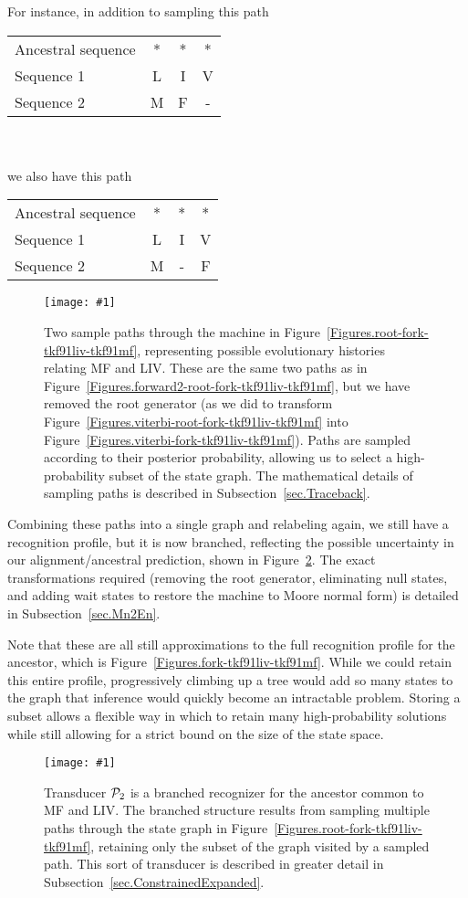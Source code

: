 \documentclass{article}
\newcommand{\secref}[1]{Subsection~\ref{sec.#1}}
\newcommand{\figref}[1]{Figure~\ref{Figures.#1}}
\newcommand{\figlabel}[1]{\label{Figures.#1}}
\newcommand{\easyfig}[4]{
\begin{figure}
\texttt{[image: \#1]}
\caption{ \figlabel{#3} #4}
\end{figure}}
\newcommand{\widepdffig}[2]{\easyfig{#1-fig.pdf}{width=\textwidth}{#1}{#2}}
\newcommand{\tallpdffig}[2]{\easyfig{#1-fig.pdf}{height=\textheight}{#1}{#2}}
\newcommand\profile{{\cal P}}
\begin{document}
\noindent For instance, in addition to sampling this path

\begin{tabular}{lccc}
Ancestral sequence & * & * & * \\
Sequence 1         & L & I & V \\
Sequence 2         & M & F & -
\end{tabular}
\\ \\ 
we also have this path

\begin{tabular}{lccc}
Ancestral sequence & * & * & * \\
Sequence 1         & L & I & V \\
Sequence 2         & M & - & F
\end{tabular}

\widepdffig{forward2-fork-tkf91liv-tkf91mf}{Two sample paths through the 
machine in \figref{root-fork-tkf91liv-tkf91mf}, representing
possible evolutionary histories relating MF and LIV.
These are the same two paths as in \figref{forward2-root-fork-tkf91liv-tkf91mf},
but we have removed the root generator (as we did to transform \figref{viterbi-root-fork-tkf91liv-tkf91mf} into \figref{viterbi-fork-tkf91liv-tkf91mf}).
Paths are sampled according to their posterior probability, 
allowing us to select a high-probability subset of the state graph.  
The mathematical details of sampling paths is described in \secref{Traceback}.}

Combining these paths into a single graph and relabeling again, 
we still have a recognition profile, but it is now branched,
reflecting the possible uncertainty in our alignment/ancestral prediction, shown in \figref{forward2-profile}.
The exact transformations required (removing the root generator, eliminating null states, and adding wait states to restore the machine to Moore normal form)
is detailed in \secref{Mn2En}.  

Note that these are all still approximations to the full
recognition profile for the ancestor, which is \figref{fork-tkf91liv-tkf91mf}.  
While we could retain this entire profile, progressively climbing up a tree
would add so many states to the graph that inference would quickly become an intractable
problem.  
Storing a subset allows a flexible way in which to retain many high-probability solutions
while still allowing for a strict bound on the size of the state space. 

\tallpdffig{forward2-profile}{Transducer $\profile_2$ is a branched recognizer for the 
ancestor common to MF and LIV.  The branched structure results from sampling
multiple paths through the state graph in \figref{root-fork-tkf91liv-tkf91mf}, 
retaining only the subset of the graph visited by a sampled path.
This sort of transducer is described in greater detail in \secref{ConstrainedExpanded}.} 
\end{document}
